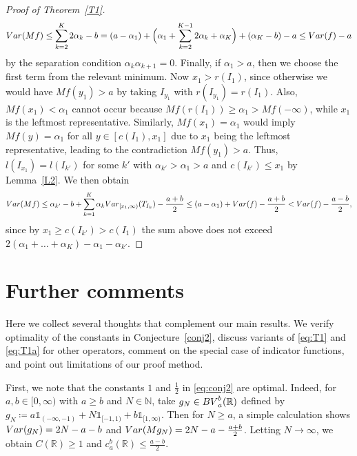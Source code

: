 \documentclass[leqno,11pt]{amsart}
\numberwithin{equation}{section}
\numberwithin{theorem}{section}
\newcommand{\RR}{\mathbb{R}}
\newcommand{\NN}{\mathbb{N}}
\newcommand{\Var}{{\rm Var}}
\newcommand{\BV}{{\rm BV}}
\newcommand{\ind}[1]{{\mathds{1}_{{#1}}}}
\begin{document}
\begin{proof}[Proof of Theorem~\ref{T1}]
		\[
		\Var(Mf) \leq
		\sum_{k =2}^K 2 \alpha_k - b = (a - \alpha_1) + \Big( \alpha_1 + \sum_{k =2}^{K-1} 2 \alpha_k + \alpha_K \Big) + (\alpha_K - b) - a \leq \Var(f) - a 
		\]
		by the separation condition $\alpha_k \alpha_{k+1} = 0$. Finally, if $\alpha_1 > a$, then we choose the first term from the relevant minimum. Now $x_1 > r(I_1)$, since otherwise we would have 
		$Mf(y_1) > a$ by taking $I_{y_1}$ with $r(I_{y_1}) = r(I_1)$. Also, $Mf(x_1) < \alpha_1$ cannot occur because $Mf(r(I_1)) \geq \alpha_1 > Mf(-\infty)$, while $x_1$ is the leftmost representative. Similarly, $Mf(x_1) = \alpha_1$ would imply   
		$Mf(y) = \alpha_1$ for all $y \in [c(I_1),x_1]$ due to $x_1$ being the leftmost representative, leading to the contradiction $Mf(y_1) > a$. Thus, $l(I_{x_1}) = l(I_{k'})$ for some $k'$ with 
		$\alpha_{k'} > \alpha_1 > a$ and $c(I_{k'}) \leq x_1$ by Lemma~\ref{L2}. We then obtain
		\[
		\Var(Mf) \leq \alpha_{k'} - b + \sum_{k=1}^K \alpha_k \Var_{[x_1, \infty)} (T_{I_k}) - \frac{a+b}{2} \leq (a-\alpha_1) + \Var(f) - \frac{a+b}{2} < \Var(f) - \frac{a-b}{2}, 
		\]
		since by $x_1 \geq c(I_{k'}) > c(I_1)$ the sum above does not exceed $2(\alpha_1 + \dots + \alpha_K)-\alpha_1 - \alpha_{k'}$.   
	\end{proof}

	\section{Further comments} \label{S4}
Here we collect several thoughts that complement our main results. We verify optimality of the constants in Conjecture~\ref{conj2}, discuss variants of 
\eqref{eq:T1} and \eqref{eq:T1a} for other operators, comment on the special case of indicator functions, and point out limitations of our proof method.   

First, we note that the constants $1$ and $\frac12$ in \eqref{eq:conj2} are optimal. Indeed, for $a,b \in [0,\infty)$ with $a \geq b$ and $N \in \NN$, take $g_N \in \BV_a^b(\RR)$ defined by 
$
g_N \coloneqq a \ind{(-\infty,-1)} + N \ind{[-1,1)} + b \ind{[1,\infty)}.
$ 
Then for $N \geq a$, a simple calculation shows $\Var(g_N) = 2N-a-b$ and $\Var(M g_N) = 2N - a - \frac{a+b}{2}$. Letting $N \to \infty$, we obtain $C(\RR) \geq 1$ and $c_a^b(\RR) \leq \frac{a-b}{2}$.
\end{document}
